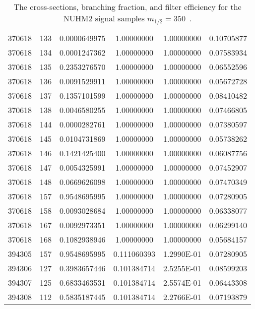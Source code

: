 \begin{table}[htp]
{{\begin{tabular}{cccccc}
                370618 & 133         & 0.0000649975         & 1.00000000  & 1.00000000        & 0.10705877\\
                370618 & 134         & 0.0001247362         & 1.00000000  & 1.00000000        & 0.07583934\\
                370618 & 135         & 0.2353276570         & 1.00000000  & 1.00000000        & 0.06552596\\
                370618 & 136         & 0.0091529911         & 1.00000000  & 1.00000000        & 0.05672728\\
                370618 & 137         & 0.1357101599         & 1.00000000  & 1.00000000        & 0.08410482\\
                370618 & 138         & 0.0046580255         & 1.00000000  & 1.00000000        & 0.07466805\\
                370618 & 144         & 0.0000282761         & 1.00000000  & 1.00000000        & 0.07380597\\
                370618 & 145         & 0.0104731869         & 1.00000000  & 1.00000000        & 0.05738262\\
                370618 & 146         & 0.1421425400         & 1.00000000  & 1.00000000        & 0.06087756\\
                370618 & 147         & 0.0054325991         & 1.00000000  & 1.00000000        & 0.07452907\\
                370618 & 148         & 0.0669626098         & 1.00000000  & 1.00000000        & 0.07470349\\
                370618 & 157         & 0.9548695995         & 1.00000000  & 1.00000000        & 0.07280905\\
                370618 & 158         & 0.0093028684         & 1.00000000  & 1.00000000        & 0.06338077\\
                370618 & 167         & 0.0092973351         & 1.00000000  & 1.00000000        & 0.06299140\\
                370618 & 168         & 0.1082938946         & 1.00000000  & 1.00000000        & 0.05684157\\
                394305 & 157         & 0.9548695995         & 0.111060393 & 1.2990E-01        & 0.07280905\\
                394306 & 127         & 0.3983657446         & 0.101384714 & 2.5255E-01        & 0.08599203\\
                394307 & 125         & 0.6833463531         & 0.101384714 & 2.5574E-01        & 0.06443308\\
                394308 & 112         & 0.5835187445         & 0.101384714 & 2.2766E-01        & 0.07193879\\
                \hline
                \hline
            \end{tabular}
        }
    }
    \caption{The cross-sections, branching fraction, and filter efficiency for the NUHM2 signal samples $m_{1/2} = 350$~{\GeV}.}
    \label{tab:app_xsec_m12_350}
\end{table}%

